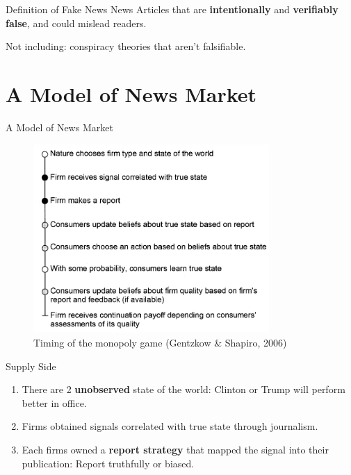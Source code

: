 \documentclass[
  10pt,
  ignorenonframetext,
  aspectratio=43,
]{beamer}
\providecommand{\tightlist}{%
  \setlength{\itemsep}{0pt}\setlength{\parskip}{0pt}}
\begin{document}
\begin{frame}{Definition of Fake News}
\protect\hypertarget{definition-of-fake-news}{}
News Articles that are \textbf{intentionally} and \textbf{verifiably
false}, and could mislead readers.

Not including: conspiracy theories that aren't falsifiable.
\end{frame}

\hypertarget{a-model-of-news-market}{%
\section{A Model of News Market}\label{a-model-of-news-market}}

\begin{frame}{A Model of News Market}
\begin{figure}
\centering
\includegraphics[width=0.8\textwidth,height=\textheight]{20220315-allcott-gentzkow-2016-election-fake-news.assets/image-20220314191927957.png}
\caption{Timing of the monopoly game (Gentzkow \& Shapiro, 2006)}
\end{figure}
\end{frame}

\begin{frame}{Supply Side}
\protect\hypertarget{supply-side}{}
\begin{enumerate}
\tightlist
\item
  There are 2 \textbf{unobserved} state of the world: Clinton or Trump
  will perform better in office.
\item
  Firms obtained signals correlated with true state through journalism.
\item
  Each firms owned a \textbf{report strategy} that mapped the signal
  into their publication: Report truthfully or biased.
\end{enumerate}
\end{frame}
\end{document}

